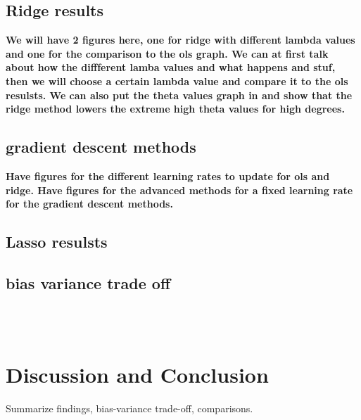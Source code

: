 \documentclass[%
 reprint,            %
 amsmath,amssymb,
 aps,
]{revtex4-2}
\begin{document}



\subsection{Ridge results}
\textbf{We will have 2 figures here, one for ridge with different lambda values and one for the comparison to the ols graph. We can at first talk about how the diffferent lamba values and what happens and stuf, then we will choose a certain lambda value and compare it to the ols resulsts. We can also put the theta values graph in and show that the ridge method lowers the extreme high theta values for high degrees.}

\subsection{gradient descent methods}
\textbf{Have figures for the different learning rates to update for ols and ridge. Have figures for the advanced methods for a fixed learning rate for the gradient descent methods.}

\subsection{Lasso resulsts}

\subsection{bias variance trade off}
\\
\\

\section{Discussion and Conclusion}
Summarize findings, bias-variance trade-off, comparisons.


\end{document}
